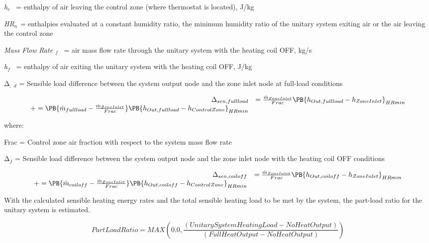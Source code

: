 \emph{h\(_{e}\)}~ = enthalpy of air leaving the control zone (where thermostat is located), J/kg

\emph{HR\(_{n}\) =} enthalpies evaluated at a constant humidity ratio, the minimum humidity ratio of the unitary system exiting air or the air leaving the control zone

\emph{Mass Flow Rate \(_{f}\)}~ = air mass flow rate through the unitary system with the heating coil OFF, kg/s

\emph{h\(_{f}\)}~ = enthalpy of air exiting the unitary system with the heating coil OFF, J/kg

Δ\(_{,}\) \emph{\(_{d}\)} = Sensible load difference between the system output node and the zone inlet node at full-load conditions

\begin{equation}
  \begin{array}{rl}
    \Delta_{sen,full load} &= \frac{\dot{m}_{ZoneInlet}}{Frac} \PB{h_{Out,full load} - h_{ZoneInlet}}_{HRmin} \\
                              += \PB{\dot{m}_{full load} - \frac{\dot{m}_{ZoneInlet}}{Frac}} \PB{h_{Out,full load} - h_{ControlZone}}_{HRmin}
  \end{array}
\end{equation}

where:

Frac = Control zone air fraction with respect to the system mass flow rate

Δ\(_{f}\) = Sensible load difference between the system output node and the zone inlet node with the heating coil OFF conditions

\begin{equation}
  \begin{array}{rl}
    \Delta_{sen,coil off} &= \frac{\dot{m}_{ZoneInlet}}{Frac} \PB{h_{Out,coil off} - h_{ZoneInlet}}_{HRmin} \\
                              += \PB{\dot{m}_{coil off} - \frac{\dot{m}_{ZoneInlet}}{Frac}} \PB{h_{Out,coil off} - h_{ControlZone}}_{HRmin}
  \end{array}
\end{equation}

With the calculated sensible heating energy rates and the total sensible heating load to be met by the system, the part-load ratio for the unitary system is estimated.

\begin{equation}
PartLoadRatio = MAX\left( {0.0,\frac{{\left( {UnitarySystemHeatingLoad - NoHeatOutput} \right)}}{{\left( {FullHeatOutput - NoHeatOutput} \right)}}} \right)
\end{equation}


